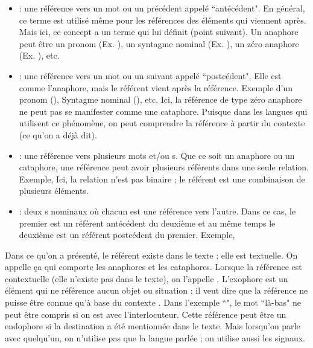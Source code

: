 \documentclass{KodeBook}
\begin{document}
\begin{itemize}
	\item {} : une référence vers un mot ou un  précédent appelé ``antécédent".
	En général, ce terme est utilisé même pour les références des éléments qui viennent après. 
	Mais ici, ce concept a un terme qui lui définit (point suivant).
	Un anaphore peut être un pronom (Ex. ), un syntagme nominal (Ex. ), un zéro anaphore (Ex. ), etc.
	
	\item {} : une référence vers un mot ou un  suivant appelé ``postcédent".
	Elle est comme l'anaphore, mais le référent vient après la référence. 
	Exemple d'un pronom (), Syntagme nominal (), etc. 
	Ici, la référence de type zéro anaphore ne peut pas se manifester comme une cataphore. 
	Puisque dans les langues qui utilisent ce phénomène, on peut comprendre la référence à partir du contexte (ce qu'on a déjà dit).
	
	\item {} : une référence vers plusieurs mots et/ou s.
	Que ce soit un anaphore ou un cataphore, une référence peut avoir plusieurs référents dans une seule relation.
	Exemple, 
	Ici, la relation n'est pas binaire ; le référent est une combinaison de plusieurs éléments. 
	
	\item {} : deux s nominaux où chacun est une référence vers l'autre. 
	Dans ce cas, le premier est un référent antécédent du deuxième et au même temps le deuxième est un référent postcédent du premier.  
	Exemple, 
	
\end{itemize}

Dans ce qu'on a présenté, le référent existe dans le texte ; elle est textuelle. 
On appelle ça  qui comporte les anaphores et les cataphores. 
Lorsque la référence est contextuelle (elle n'existe pas dans le texte), on l'appelle .
L'exophore est un élément qui ne référence aucun objet ou situation ; il veut dire que la référence ne puisse être connue qu'à base du contexte \cite{2014-halliday-hasan}. 
Dans l'exemple ``", le mot ``là-bas" ne peut être compris si on est avec l'interlocuteur. 
Cette référence peut être un endophore si la destination a été mentionnée dans le texte. 
Mais lorsqu'on parle avec quelqu'un, on n'utilise pas que la langue parlée ; on utilise aussi les signaux.
\end{document}
